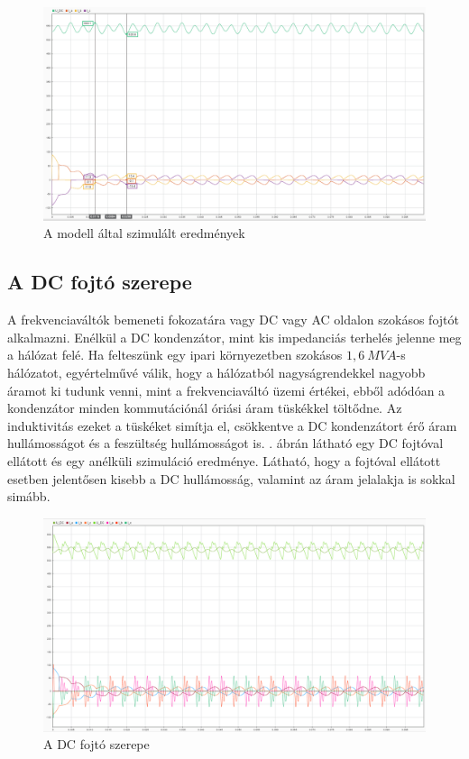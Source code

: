 \begin{figure}[H]
	\centering
	\includegraphics[width = \textwidth]{figures/continous_testrun_1.png}
	\caption{A modell által szimulált eredmények} 
	\label{fig:cont_run}
\end{figure}

\subsection{A DC fojtó szerepe}

A frekvenciaváltók bemeneti fokozatára vagy DC vagy AC oldalon szokásos fojtót alkalmazni. Enélkül a DC kondenzátor, mint kis impedanciás terhelés jelenne meg a hálózat felé. Ha felteszünk egy ipari környezetben szokásos $1,6\ MVA$-s hálózatot, egyértelművé válik, hogy a hálózatból nagyságrendekkel nagyobb áramot ki tudunk venni, mint a frekvenciaváltó üzemi értékei, ebből adódóan a kondenzátor minden kommutációnál óriási áram tüskékkel töltődne. Az induktivitás ezeket a tüskéket simítja el, csökkentve a DC kondenzátort érő áram hullámosságot és a feszültség hullámosságot is. . ábrán látható egy DC fojtóval ellátott és egy anélküli szimuláció eredménye. Látható, hogy a fojtóval ellátott esetben jelentősen kisebb a DC hullámosság, valamint az áram jelalakja is sokkal simább.

\begin{figure}[H!]
	\centering
	\includegraphics[width = \textwidth]{figures/choke_vs_nochoke_11A.png}
	\caption{A DC fojtó szerepe} 
	\label{fig:chokenochoke}
\end{figure}



